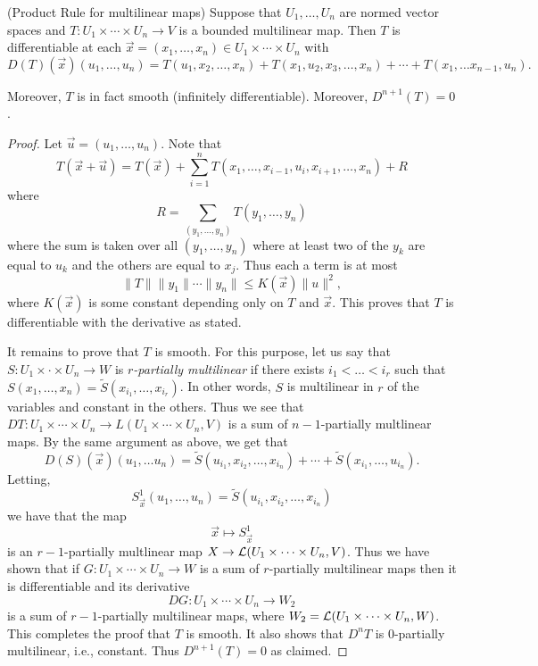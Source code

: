 \documentclass[twoside, a4paper, 10pt]{amsart}
\begin{document}
\begin{lemma}(Product Rule for multilinear maps) Suppose that $U_1, \ldots, U_n$ are normed vector spaces and $T: U_1 \times \cdots \times U_n \to V$ is a bounded multilinear map. Then $T$ is differentiable at each $\vec{x} = (x_1, \ldots, x_n) \in U_1 \times \cdots \times U_n $ with $$D(T)(\vec{x})(u_1, \ldots, u_n) = T(u_1, x_2, \ldots, x_n) + T(x_1, u_2, x_3, \ldots, x_n) + \cdots + T(x_1, \ldots x_{n-1}, u_n). $$

Moreover, $T$ is in fact smooth (infinitely differentiable). Moreover, $D^{n+1}(T) = 0$.
\end{lemma}

\begin{proof} Let $\vec{u} = (u_1, \ldots, u_n)$. Note that 
$$T(\vec{x} + \vec{u}) = T(\vec{x}) + \sum_{i=1}^n T(x_1, \ldots, x_{i-1}, u_i, x_{i+1}, \ldots, x_n) + R$$ where $$R = \sum_{(y_1, \ldots, y_n)} T(y_1, \ldots, y_n)$$ where the sum is taken over all $(y_1, \ldots, y_n)$ where at least two of the $y_k$ are equal to $u_k$ and the others are equal to $x_j$. Thus each a term is at most $$\|T \|\|y_1\|\cdots \|y_n\| \leq K(\vec{x}) \|u\|^2,$$ where $K(\vec{x})$ is some constant depending only on $T$ and $\vec{x}$. This proves that $T$ is differentiable with the derivative as stated.

It remains to prove that $T$ is smooth. For this purpose, let us say that $S:U_1 \times \cdot \times U_n \to W$ is \textit{$r$-partially multilinear} if there exists $i_1 < \ldots <i_r$ such that $S(x_1, \ldots, x_n) = \tilde{S}(x_{i_1}, \ldots, x_{i_r})$. In other words, $S$ is multilinear in $r$ of the variables and constant in the others. Thus we see that $DT:U_1 \times \cdots \times U_n \to L(U_1 \times \cdots \times U_n, V)$ is a sum of $n-1$-partially multlinear maps. By the same argument as above, we get that 
$$D(S)(\vec{x})(u_1, \ldots u_n) = \tilde{S}(u_{i_1},x_{i_2}, \ldots, x_{i_n}) + \cdots + \tilde{S}(x_{i_1}, \ldots, u_{i_n}).$$ Letting, $$S^1_{\vec{x}}(u_1, \ldots, u_n) = \tilde{S}(u_{i_1},x_{i_2}, \ldots, x_{i_n}) $$ we have that the map
$$\vec{x} \mapsto S^1_{\vec{x}}$$ is an $r-1$-partially multlinear map $X \to \mathcal{L}(U_1 \times \cdots \times U_n, V)$. Thus we have shown that if $G:U_1 \times \cdots \times U_n \to W$ is a sum of $r$-partially multilinear maps then it is differentiable and its derivative $$DG:U_1 \times \cdots \times U_n \to W_2$$ is a sum of $r-1$-partially multilinear maps, where $W_2 = \mathcal{L}(U_1 \times \cdots \times U_n, W)$. This completes the proof that $T$ is smooth. It also shows that $D^nT$ is $0$-partially multilinear, i.e., constant. Thus $D^{n+1}(T) = 0$ as claimed. \end{proof}
\end{document}
